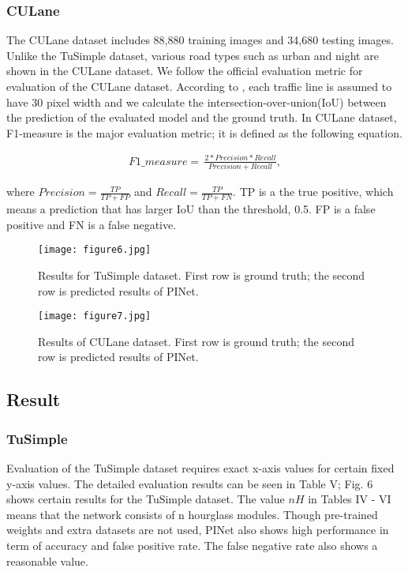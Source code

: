 \documentclass[journal]{IEEEtran}
\begin{document}
\subsubsection{CULane}
The CULane dataset includes 88,880 training images and 34,680 testing images. Unlike the TuSimple dataset, various road types such as urban and night are shown in the CULane dataset. We follow the official evaluation metric \cite{pan2018spatial} for evaluation of the CULane dataset. According to \cite{pan2018spatial}, each traffic line is assumed to have 30 pixel width and we calculate the intersection-over-union(IoU) between the prediction of the evaluated model and the ground truth. In CULane dataset, F1-measure is the major evaluation metric; it is defined as the following equation.

\begin{equation}
    \begin{aligned}
        F1\_measure = \,  \frac{2 * Precision * Recall}{Precision + Recall} ,
    \end{aligned}
\end{equation}

where $Precision = \frac{TP}{TP+FP}$ and $Recall = \frac{TP}{TP+FN}$. TP is a the true positive, which means a prediction that has larger IoU than the threshold, 0.5. FP is a false positive and FN is a false negative.







\begin{figure*}
    \centering
    \texttt{[image: figure6.jpg]}
    \caption{Results for TuSimple dataset. First row is ground truth; the second row is predicted results of PINet.}
\end{figure*}


\begin{figure*}
    \centering
    \texttt{[image: figure7.jpg]}
    \caption{Results of CULane dataset. First row is ground truth; the second row is predicted results of PINet.}
\end{figure*}

\subsection{Result}

\subsubsection{TuSimple}
Evaluation of the TuSimple dataset requires exact x-axis values for certain fixed y-axis values. The detailed evaluation results can be seen in Table V; Fig. 6 shows certain results for the TuSimple dataset. The value $nH$ in Tables IV - VI means that the network consists of n hourglass modules. Though pre-trained weights and extra datasets are not used, PINet also shows high performance in term of accuracy and false positive rate. The false negative rate also shows a reasonable value. 
\end{document}
